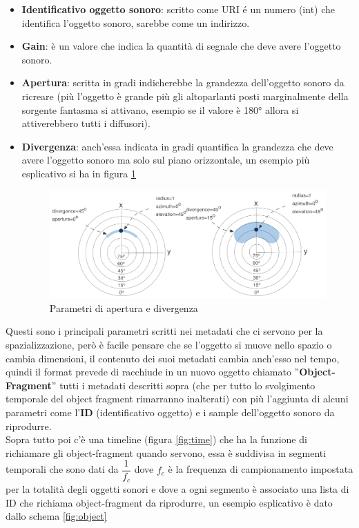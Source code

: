 \documentclass[12pt,a4paper]{report}
\begin{document}
\begin{itemize}
\item \textbf{Identificativo oggetto sonoro}: scritto come URI é un numero (int) che identifica l'oggetto sonoro, sarebbe come un indirizzo.
\item \textbf{Gain}: è un valore che indica la quantità di segnale che deve avere l'oggetto sonoro.
\item \textbf{Apertura}: scritta in gradi indicherebbe la grandezza dell'oggetto sonoro da ricreare (più l'oggetto è grande più gli altoparlanti posti marginalmente della sorgente fantasma si attivano, esempio se il valore è 180° allora si attiverebbero tutti i diffusori).
\item \textbf{Divergenza}: anch'essa indicata in gradi quantifica la grandezza che deve avere l'oggetto sonoro ma solo sul piano orizzontale, un esempio più esplicativo si ha in figura \ref{fig:apertura}

	\begin{figure}[htbp]
	\centering
	\includegraphics[scale=0.35]{figures/apertura.png}
	\caption {Parametri di apertura e divergenza}
	\label{fig:apertura}
	\end{figure}


\end{itemize}

Questi sono i principali parametri scritti nei metadati che ci servono per la spazializzazione, però è facile pensare che se l'oggetto si muove nello spazio o cambia dimensioni, il contenuto dei suoi metadati cambia anch'esso nel tempo, quindi il format prevede di racchiude in un nuovo oggetto chiamato ''\textbf{Object-Fragment}'' tutti i metadati descritti sopra (che per tutto lo svolgimento temporale del object fragment rimarranno inalterati) con più l'aggiunta di alcuni parametri come l'\textbf{ID} (identificativo oggetto) e i sample dell'oggetto sonoro da riprodurre.\\

Sopra tutto poi c'è una timeline (figura \ref{fig:time}) che ha la funzione di richiamare gli object-fragment quando servono, essa è suddivisa in segmenti temporali che sono dati da $\dfrac{1}{f_c}$ dove $f_c$ è la frequenza di campionamento impostata per la totalità degli oggetti sonori e dove a ogni segmento è associato una lista di ID che richiama object-fragment da riprodurre, un esempio esplicativo è dato dallo schema \ref{fig:object}\\
\end{document}
